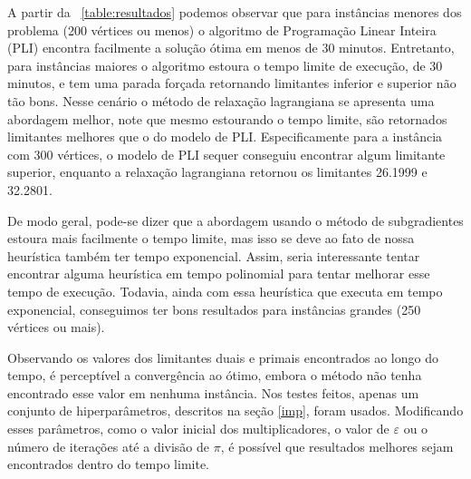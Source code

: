 \documentclass{TEMA}
\begin{document}
        A partir da \tablename~\ref{table:resultados} podemos observar que para instâncias menores dos problema  (200 vértices ou menos) o algoritmo de Programação Linear Inteira (PLI) encontra facilmente a solução ótima em menos de 30 minutos. Entretanto, para instâncias maiores o algoritmo estoura o tempo limite de execução, de 30 minutos, e tem uma parada forçada retornando limitantes inferior e superior não tão bons. Nesse cenário o método de relaxação lagrangiana se apresenta uma abordagem melhor, note que mesmo estourando o tempo limite, são retornados limitantes melhores que o do modelo de PLI. Especificamente para a instância com 300 vértices, o modelo de PLI sequer conseguiu encontrar algum limitante superior, enquanto a relaxação lagrangiana retornou os limitantes 26.1999 e 32.2801.
        
        De modo geral, pode-se dizer que a abordagem usando o método de subgradientes estoura mais facilmente o tempo limite, mas isso se deve ao fato de nossa heurística também ter tempo exponencial. Assim, seria interessante tentar encontrar alguma heurística em tempo polinomial para tentar melhorar esse tempo de execução. Todavia, ainda com essa heurística que executa em tempo exponencial, conseguimos ter bons resultados para instâncias grandes (250 vértices ou mais).
        
        Observando os valores dos limitantes duais e primais encontrados ao longo do tempo, é perceptível a convergência ao ótimo, embora o método não tenha encontrado esse valor em nenhuma instância. 
        Nos testes feitos, apenas um conjunto de hiperparâmetros, descritos na seção \ref{imp}, foram usados. Modificando esses parâmetros, como o valor inicial dos multiplicadores, o valor de $\varepsilon$ ou o número de iterações até a divisão de $\pi$, é possível que resultados melhores sejam encontrados dentro do tempo limite.



\end{document}
